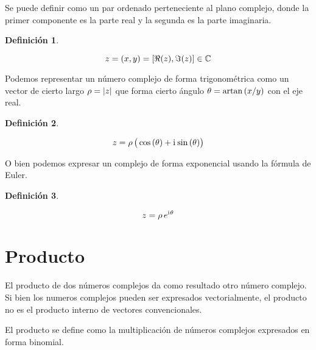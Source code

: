 \documentclass[a5paper,12pt,twoside]{book}
\newtheorem{defn}{{Definición}}[chapter]
\begin{document}
Se puede definir como un par ordenado perteneciente al plano complejo, donde la primer componente es la parte real y la segunda es la parte imaginaria.

\begin{mdframed}[style=MyFrame1]
    \begin{defn}
        \label{defn:VectorForm}
    \end{defn}
    \begin{equation*}
        z = (x,y) = \left[\Re(z),\Im(z)\right] \in \mathbb{C}
    \end{equation*}
\end{mdframed}

Podemos representar un número complejo de forma trigonométrica como un vector de cierto largo $\rho={\left| {z} \right|}$ que forma cierto ángulo $\theta = \operatorname{artan}{(x/y)}$ con el eje real.

\begin{mdframed}[style=MyFrame1]
    \begin{defn}
        \label{defn:TrigForm}
    \end{defn}
    \begin{equation*}
        z = \rho \, \big( \cos{(\theta)} + \mathrm{i}\mkern1mu \sin{(\theta)} \big)
    \end{equation*}
\end{mdframed}

O bien podemos expresar un complejo de forma exponencial usando la fórmula de Euler.

\begin{mdframed}[style=MyFrame1]
    \begin{defn}
        \label{defn:ExpForm}
    \end{defn}
    \begin{equation*}
        z = \rho \, e^{\mathrm{i}\mkern1mu \theta}
    \end{equation*}
\end{mdframed}


\section{Producto}

El producto de dos números complejos da como resultado otro número complejo. Si bien los numeros complejos pueden ser expresados vectorialmente, el producto no es el producto interno de vectores convencionales.

El producto se define como la multiplicación de números complejos expresados en forma binomial.
\end{document}
